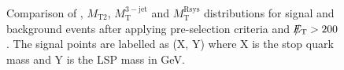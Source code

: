 \begin{figure}[!t]
  \centering
{}
  \caption{Comparison of \met, $M_\mathrm{T2}$, $M_\mathrm{T}^\mathrm{3-jet}$ and $M_\mathrm{T}^\mathrm{Rsys}$ distributions for signal and background events after applying pre-selection criteria and $\slash\mkern-12mu{E}_{\text{T}} > 200$\gev. The signal points are labelled as (X, Y) where X is the stop quark mass and Y is the LSP mass in GeV.}
  \label{fig:stop_ref_plots}
\end{figure} 

